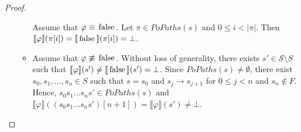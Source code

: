 \documentclass[12pt]{article}
\newcommand{\TRUE}{\mbox{\lstinline{true}}}
\newcommand{\FALSE}{\mbox{\lstinline{false}}}
\theoremstyle{definition}
\newcommand{\satisfaction}[1]{\llbracket #1 \rrbracket}
\newcommand{\bottom}{\mathord{\perp}}
\newenvironment{franck}{\color{red}}{\color{black}}
\begin{document}
\begin{franck}
\begin{proof}
\begin{enumerate}
\begin{itemize}
Assume that $\varphi \equiv \FALSE$.  Let $\pi \in \mathit{PoPaths}(s)$ and $0 \leq i < |\pi|$.  Then $\satisfaction{\varphi}(\pi[i]) = \satisfaction{\FALSE}(\pi[i]) = \bottom$.
\item
Assume that $\varphi \not\equiv \FALSE$.  Without loss of generality, there exists $s' \in \mathcal{S} \setminus S$ such that $\satisfaction{\varphi}(s') \not= \satisfaction{\FALSE}(s') = \bottom$.  Since $\mathit{PoPaths}(s) \not= \emptyset$, there exist $s_0, s_1, \ldots, s_n \in S$ such that $s = s_0$ and $s_j \rightarrow s_{j+1}$ for $0 \leq j < n$ and $s_n \not\in F$.  Hence, $s_0 s_1 \ldots s_n s' \in \mathit{PoPaths}(s)$ and $\satisfaction{\varphi}((s_0 s_1 \ldots s_n s')[n+1]) = \satisfaction{\varphi}(s') \not= \bottom$.
\end{itemize}
%
%
\end{enumerate}
\end{proof}


\end{franck}
\end{document}
